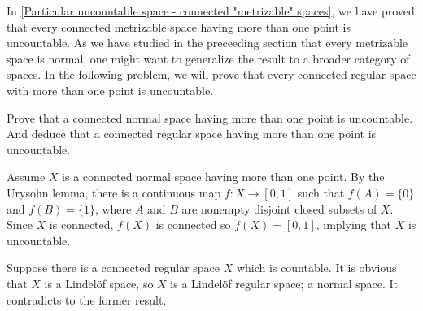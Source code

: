 In \cref{Particular uncountable space - connected "metrizable" spaces}, we have proved that every connected metrizable space having more than one point is uncountable.
As we have studied in the preceeding section that every metrizable space is normal, one might want to generalize the result to a broader category of spaces.
In the following problem, we will prove that every connected regular space with more than one point is uncountable.
\begin{prob}\label{nontrivial connected regular spaces are uncountable}
    Prove that a connected normal space having more than one point is uncountable.
    And deduce that a connected regular space having more than one point is uncountable.
\end{prob}
\begin{sol}
    Assume $X$ is a connected normal space having more than one point.
    By the Urysohn lemma, there is a continuous map $f: X\rightarrow[0, 1]$ such that $f(A)=\{0\}$ and $f(B)=\{1\}$, where $A$ and $B$ are nonempty disjoint closed subsets of $X$.
    Since $X$ is connected, $f(X)$ is connected so $f(X)=[0, 1]$, implying that $X$ is uncountable.
            
    Suppose there is a connected regular space $X$ which is countable.
    It is obvious that $X$ is a Lindel\"of space, so $X$ is a Lindel\"of regular space; a normal space.
    It contradicts to the former result.
\end{sol}

